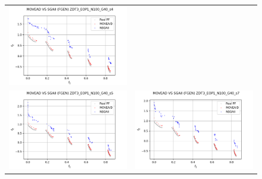 \begin{figure}[H]
\begin{tabular}{c c}
    \includegraphics[scale=0.5]{figures/ZDT3_EOP1_N100_G40_T15/s4_comp.png}\\
    \includegraphics[scale=0.5]{figures/ZDT3_EOP1_N100_G40_T15/s5_comp.png} &
    \includegraphics[scale=0.5]{figures/ZDT3_EOP1_N100_G40_T15/s7_comp.png}\\

\end{tabular}
\end{figure}
